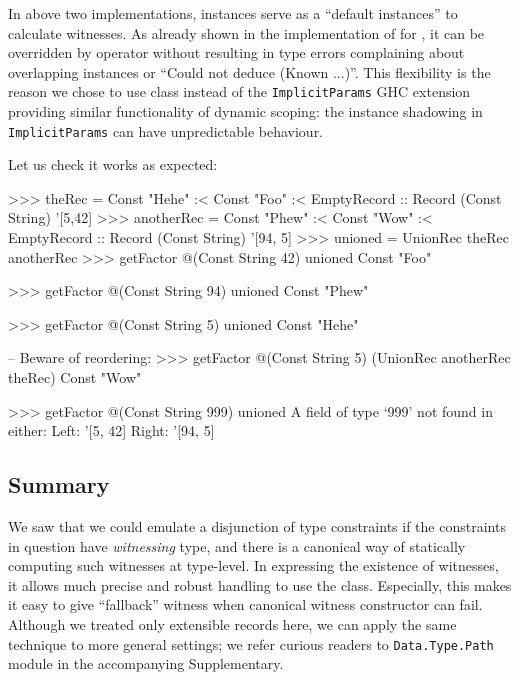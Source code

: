 \documentclass[demotion-paper.tex]{subfiles}
\begin{document}
In above two implementations,  instances serve as a ``default instances'' to calculate witnesses.
As already shown in the implementation of  for , it can be overridden by  operator without resulting in type errors complaining about overlapping instances or ``Could not deduce (Known ...)''.
This flexibility is the reason we chose to use  class instead of the \texttt{ImplicitParams} GHC extension providing similar functionality of dynamic scoping:  the instance shadowing in \texttt{ImplicitParams} can have unpredictable behaviour.

Let us check it works as expected:

\begin{repl}
>>> theRec = Const "Hehe" :< Const "Foo"
      :< EmptyRecord
      :: Record (Const String) '[5,42]
>>> anotherRec = Const "Phew" :< Const "Wow"
      :< EmptyRecord
      :: Record (Const String) '[94, 5]
>>> unioned = UnionRec theRec anotherRec
>>> getFactor @(Const String 42) unioned
Const "Foo"

>>> getFactor @(Const String 94) unioned
Const "Phew"

>>> getFactor @(Const String 5) unioned
Const "Hehe"

-- Beware of reordering:
>>> getFactor @(Const String 5) 
      (UnionRec anotherRec theRec)
Const "Wow"

>>> getFactor @(Const String 999) unioned
A field of type `999' not found in either:
   Left: '[5, 42]
  Right: '[94, 5]
\end{repl}

\subsection{Summary}
We saw that we could emulate a disjunction of type constraints if the constraints in question have \emph{witnessing} type, and there is a canonical way of statically computing such witnesses at type-level.
In expressing the existence of witnesses, it allows much precise and robust handling to use the  class.
Especially, this makes it easy to give ``fallback'' witness when canonical witness constructor can fail.
Although we treated only extensible records here, we can apply the same technique to more general settings;
we refer curious readers to \texttt{Data.Type.Path} module in the accompanying Supplementary. 
\end{document}
